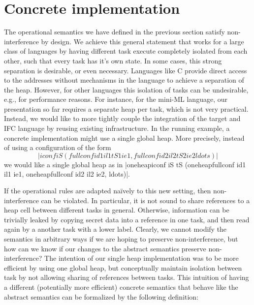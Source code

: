 \section{Concrete implementation}
\label{sec:concrete}

\newcommand{\con}[1]{\ensuremath{{\color{red} #1}}}
\newcommand{\abs}[1]{\ensuremath{{\color{blue} #1}}}

The operational semantics we have defined in the previous section
satisfy non-interference by design.
We achieve this general statement that works for a large class of
languages by having different task execute completely isolated from
each other, such that every task has it's own state.
In some cases, this strong separation is desirable, or even necessary.
Languages like C provide direct access to the addresses without
mechanisms in the language to achieve a separation of the heap.
However, for other languages this isolation of tasks can be
undesirable, e.g., for performance reasons.
For instance, for the mini-ML language, our presentation so far
requires a separate heap per task, which is not very practical.
Instead, we would like to
more tightly couple the integration of the target and IFC
language by reusing existing infrastructure.  In the running example,
a concrete implementation might use a single global heap.
More precisely, instead of using a configuration of the form
\[|iconf iS (fullconf id1 il1 tS1 ie1, fullconf id2 il2 tS2 ie2 ldots)|\]
we would like a single global heap as in
|oneheapiconf iS tS (oneheapfullconf id1 il1 ie1, oneheapfullconf id2 il2 ie2, ldots)|.

If the operational rules are adapted na\"ively to this new setting,
then non-interference can be violated.  In particular, it is not
sound to share references to a heap cell between different tasks
in general.  Otherwise, information can be trivially leaked by copying
secret data into a reference in one task, and then
read again by a another task with a lower label.
Clearly, we cannot
modify the semantics in arbitrary ways if we are hoping to preserve
non-interference, but how can we know if our changes to the abstract
semantics preserve non-interference?
The intention of our single heap implementation was to be more efficient
by using one global heap, but conceptually maintain isolation between
task by not allowing sharing of references between tasks.
This intuition of having a different (potentially more efficient)
concrete semantics that behave like the abstract semantics
can be formalized by the following definition:

